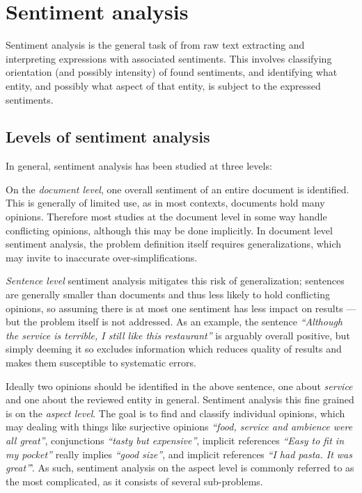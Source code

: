 \documentclass[a4paper,11pt]{kth-mag}
\begin{document}

\section{Sentiment analysis}
Sentiment analysis\cite{liu2012sentiment} is the general task of from raw text extracting and interpreting expressions with associated sentiments. This involves classifying orientation (and possibly intensity) of found sentiments, and identifying what entity, and possibly what aspect of that entity, is subject to the expressed sentiments. 

\subsection{Levels of sentiment analysis}
In general, sentiment analysis has been studied at three levels:

On the \emph{document level}, one overall sentiment of an entire document is identified. This is generally of limited use, as in most contexts, documents hold many opinions. Therefore most studies at the document level in some way handle conflicting opinions, although this may be done implicitly\cite[Chapter~3]{liu2012sentiment}. In document level sentiment analysis, the problem definition itself requires generalizations, which may invite to inaccurate over-simplifications.

\emph{Sentence level} sentiment analysis mitigates this risk of generalization; sentences are generally smaller than documents and thus less likely to hold conflicting opinions, so assuming there is at most one sentiment has less impact on results --- but the problem itself is not addressed. As an example, the sentence \emph{``Although the service is terrible, I still like this restaurant''} is arguably overall positive, but simply deeming it so excludes information which reduces quality of results and makes them susceptible to systematic errors.

Ideally two opinions should be identified in the above sentence, one about \emph{service} and one about the reviewed entity in general. Sentiment analysis this fine grained is on the \emph{aspect level}. The goal is to find and classify individual opinions, which may  dealing with things like surjective opinions \emph{``food, service and ambience were all great''}, conjunctions \emph{``tasty but expensive''}, implicit references \emph{``Easy to fit in my pocket''} really implies \emph{``good size''}, and implicit references \emph{``I had pasta. It was great''}'. As such, sentiment analysis on the aspect level is commonly referred to as the most complicated, as it consists of several sub-problems\cite[chapter 1]{liu2012sentiment}.
\end{document}
